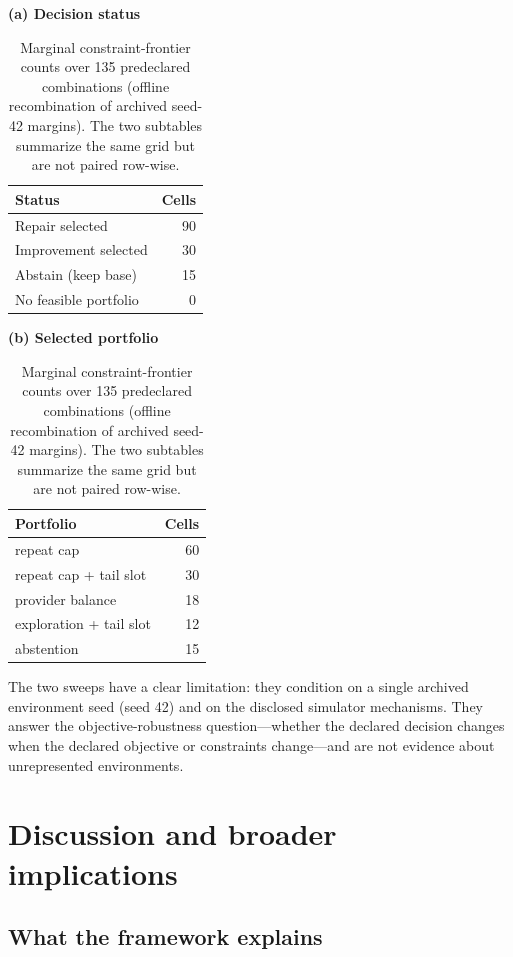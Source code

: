 \documentclass[review]{elsarticle}
\theoremstyle{plain}
\theoremstyle{definition}
\theoremstyle{remark}
\begin{document}
\begin{table}[t]
\caption{Marginal constraint-frontier counts over 135 predeclared combinations (offline recombination of archived seed-42 margins). The two subtables summarize the same grid but are not paired row-wise.}\label{tab:frontier}
\centering
\scriptsize
\setlength{\tabcolsep}{4pt}
\begin{minipage}[t]{0.43\textwidth}
\centering
\textbf{(a) Decision status}\\[2pt]
\begin{tabular}{@{}lr@{}}
\toprule
Status & Cells\\
\midrule
Repair selected & 90\\
Improvement selected & 30\\
Abstain (keep base) & 15\\
No feasible portfolio & 0\\
\bottomrule
\end{tabular}
\end{minipage}\hfill
\begin{minipage}[t]{0.50\textwidth}
\centering
\textbf{(b) Selected portfolio}\\[2pt]
\begin{tabular}{@{}lr@{}}
\toprule
Portfolio & Cells\\
\midrule
repeat cap & 60\\
repeat cap + tail slot & 30\\
provider balance & 18\\
exploration + tail slot & 12\\
abstention & 15\\
\bottomrule
\end{tabular}
\end{minipage}
\end{table}

The two sweeps have a clear limitation: they condition on a single archived environment seed (seed 42) and on the disclosed simulator mechanisms. They answer the objective-robustness question---whether the declared decision changes when the declared objective or constraints change---and are not evidence about unrepresented environments.

\section{Discussion and broader implications}\label{sec:discussion}

\subsection{What the framework explains}
\end{document}
